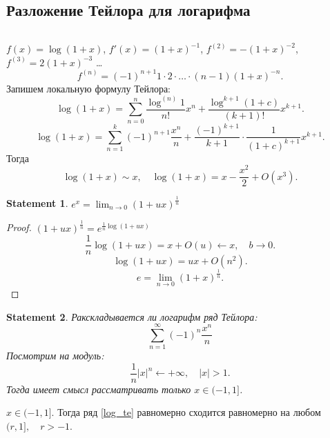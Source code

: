 \documentclass[11pt]{book}
\theoremstyle{definition}
\theoremstyle{plain}
\theoremstyle{plain}
\newtheorem*{st}{Statement}
\theoremstyle{definition}
\theoremstyle{remark}
\begin{document}
\subsection{Разложение Тейлора для логарифма}
\begin{thm}
    $ $

    $ f(x) = \log(1+x)$, $ f'(x) = (1+x) ^{-1}$, $ f^{(2)} = -(1+x)^{-2}$, $ f^{(3)} = 2 (1+x) ^{ -3}$ \ldots
    \[
	f^{(n)} = (-1)^{n+1} 1 \cdot  2\cdot  \ldots \cdot (n-1) (1+x) ^{-n}
    .\]
    Запишем локальную формулу Тейлора:
    \[
	\log(1+x)=\sum_{n=0}^{n}\frac{\log^{(n)} 1}{n!} x^{n} + \frac{\log^{k+1} (1 + c)}{(k+1)!} x ^{ k+1}
    .\]
    \[
	\log(1+x) = \sum_{n=1} ^{k}  (-1)^{n+1} \frac{x^{n}}{n} + \frac{(-1)^{ k+1}}{k+1}\cdot  \frac{1}{(1+c)^{k+1}}x ^{ k+1}
    .\]
    Тогда
    \[
	\log(1+x) \sim x, \quad \log(1+x) = x - \frac{x^2}{2} + O(x^3)
    .\]
\end{thm}
\begin{st}
    $ e^{x} = \lim_{n \to 0}  (1 + ux) ^{ \frac{1}{n}}$
\end{st}
\begin{proof}
    $ (1+ux)^{\frac{1}{n}} = e ^{ \frac{1}{n}\log(1+ux)}$
    \[
	\frac{1}{n} \log (1+ux) = x + O(u) \longleftarrow  x, \quad b \to  0
    .\]
    \[
	\log(1+ux) = ux + O(n^2)
    .\]
    \[
	e = \lim_{n \to  0} (1+x) ^{\frac{1}{n}}
    .\]
\end{proof}
\begin{st}
    Ракскладывается ли логарифм  ряд Тейлора:
    \begin{equation}\label{log_te}
	\sum_{n=1} ^{\infty} (-1)^{ n} \frac{x^{n}}{n}
    \end{equation}
    Посмотрим на модуль:
    \[
	\frac{1}{n} |x|^{n} \longleftarrow +\infty, \quad | x | > 1
    .\]
    Тогда имеет смысл рассматривать только $ x\in (-1, 1]$.
\end{st}
\begin{thm}
    $ x \in (-1, 1]$. Тогда ряд \ref{log_te} равномерно сходится равномерно  на любом $ (r , 1], \quad r>-1$.
\end{thm}
\end{document}
